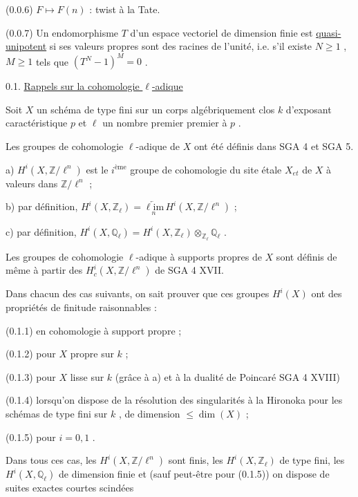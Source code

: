 (0.0.6)    $F \longmapsto F(n)$ : twist à la Tate.

(0.0.7)    Un endomorphisme  $T$  d'un espace vectoriel de dimension finie est \underline{quasi-unipotent} si ses valeurs propres sont des racines de l'unité, i.e. s'il existe $N \geqslant 1$ , $M \geqslant 1$  tels que $(T^N - 1)^M = 0$ .


0.1.  \underline{Rappels sur la cohomologie $\ell$-adique}

Soit  $X$  un schéma de type fini sur un corps algébriquement clos  $k$  d'exposant caractéristique  $p$  et  $\ell$  un nombre premier premier à  $p$ .

Les groupes de cohomologie $\ell$-adique de  $X$  ont été définis dans SGA 4 et SGA 5.

a) $H^i(X,\mathbb{Z}/\ell^n)$  est le $i^{\text{ème}}$ groupe de cohomologie du site étale  $X_{et}$  de  $X$  à valeurs dans  $\mathbb{Z}/\ell^n$ ;

b) par définition,  $H^i(X,\mathbb{Z}_\ell) = \underset{n}{\underleftarrow{\ell\mathrm{im}}}\, H^i(X,\mathbb{Z}/\ell^n)$  ;

c) par définition,  $H^i(X,\mathbb{Q}_\ell) = H^i(X,\mathbb{Z}_\ell) \otimes_{\mathbb{Z}_\ell} \mathbb{Q}_\ell$ .

Les groupes de cohomologie $\ell$-adique à supports propres de  $X$  sont définis de même à partir des  $H^i_c(X,\mathbb{Z}/\ell^n)$  de SGA 4 XVII.

Dans chacun des cas suivants, on sait prouver que ces groupes  $H^i(X)$  ont des propriétés de finitude raisonnables :

(0.1.1)    en cohomologie à support propre ;

(0.1.2)    pour  $X$  propre sur  $k$ ;

(0.1.3)    pour  $X$  lisse sur  $k$ (grâce à  a)  et à la dualité de Poincaré SGA 4 XVIII)

(0.1.4)    lorsqu'on dispose de la résolution des singularités à la Hironoka pour les schémas de type fini sur  $k$ , de dimension $\leqslant \dim(X)$ ;

(0.1.5)    pour  $i = 0, 1$ .



Dans tous ces cas, les  $H^i(X,\mathbb{Z}/\ell^n)$  sont finis, les $H^i(X,\mathbb{Z}_\ell)$  de type fini, les $H^i(X,\mathbb{Q}_\ell)$  de dimension finie et (sauf peut-être pour (0.1.5)) on dispose de suites exactes courtes scindées

